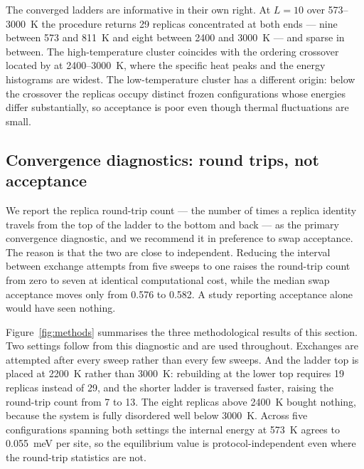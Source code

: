 \documentclass[11pt,a4paper]{article}
\begin{document}
The converged ladders are informative in their own right. At $L = 10$ over
573--3000~K the procedure returns 29 replicas concentrated at both ends --- nine
between 573 and 811~K and eight between 2400 and 3000~K --- and sparse in
between. The high-temperature cluster coincides with the ordering crossover
located by \citet{yu2026} at 2400--3000~K, where the specific heat peaks and the
energy histograms are widest. The low-temperature cluster has a different
origin: below the crossover the replicas occupy distinct frozen configurations
whose energies differ substantially, so acceptance is poor even though thermal
fluctuations are small.

\subsection{Convergence diagnostics: round trips, not acceptance}
\label{sec:roundtrips}

We report the replica round-trip count --- the number of times a replica
identity travels from the top of the ladder to the bottom and back --- as the
primary convergence diagnostic, and we recommend it in preference to swap
acceptance. The reason is that the two are close to independent. Reducing the
interval between exchange attempts from five sweeps to one raises the round-trip
count from zero to seven at identical computational cost, while the median swap
acceptance moves only from 0.576 to 0.582. A study reporting acceptance alone
would have seen nothing.

Figure~\ref{fig:methods} summarises the three methodological results of this
section. Two settings follow from this diagnostic and are used throughout. Exchanges are
attempted after every sweep rather than every few sweeps. And the ladder top is
placed at 2200~K rather than 3000~K: rebuilding at the lower top requires 19
replicas instead of 29, and the shorter ladder is traversed faster, raising the
round-trip count from 7 to 13. The eight replicas above 2400~K bought nothing,
because the system is fully disordered well below 3000~K. Across five
configurations spanning both settings the internal energy at 573~K agrees to
0.055~meV per site, so the equilibrium value is protocol-independent even where
the round-trip statistics are not.
\end{document}
